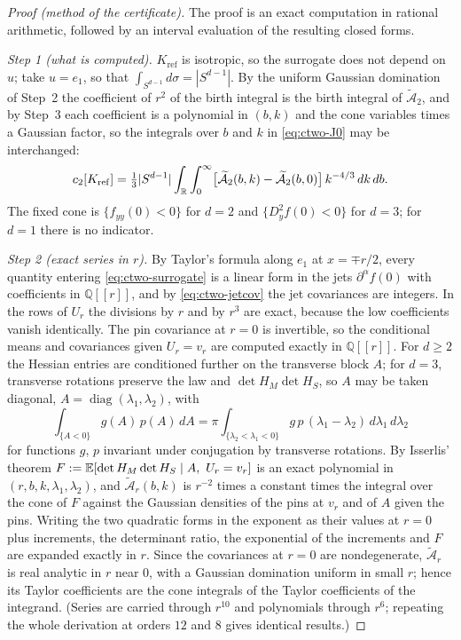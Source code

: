 \begin{proof}[Proof (method of the certificate)]
The proof is an exact computation in rational arithmetic, followed by an interval evaluation of the resulting closed forms.

\emph{Step 1 (what is computed).} $K_{\mathrm{ref}}$ is isotropic, so the surrogate does not depend on $u$; take $u=e_1$, so that $\int_{S^{d-1}}d\sigma=|S^{d-1}|$. By the uniform Gaussian domination of Step~2 the coefficient of $r^2$ of the birth integral is the birth integral of $\widetilde{\mathcal A}_2$, and by Step~3 each coefficient is a polynomial in $(b,k)$ and the cone variables times a Gaussian factor, so the integrals over $b$ and $k$ in \eqref{eq:ctwo-J0} may be interchanged:
\[
c_2[K_{\mathrm{ref}}]=\tfrac13|S^{d-1}|\int_\mathbb R\int_0^\infty\bigl[\widetilde{\mathcal A}_2(b,k)-\widetilde{\mathcal A}_2(b,0)\bigr]\,k^{-4/3}\,dk\,db .
\]
The fixed cone is $\{f_{yy}(0)<0\}$ for $d=2$ and $\{D_y^2f(0)<0\}$ for $d=3$; for $d=1$ there is no indicator.

\emph{Step 2 (exact series in $r$).} By Taylor's formula along $e_1$ at $x=\mp r/2$, every quantity entering \eqref{eq:ctwo-surrogate} is a linear form in the jets $\partial^\alpha f(0)$ with coefficients in $\mathbb Q[[r]]$, and by \eqref{eq:ctwo-jetcov} the jet covariances are integers. In the rows of $U_r$ the divisions by $r$ and by $r^3$ are exact, because the low coefficients vanish identically. The pin covariance at $r=0$ is invertible, so the conditional means and covariances given $U_r=v_r$ are computed exactly in $\mathbb Q[[r]]$. For $d\ge2$ the Hessian entries are conditioned further on the transverse block $A$; for $d=3$, transverse rotations preserve the law and $\det H_M\det H_S$, so $A$ may be taken diagonal, $A=\operatorname{diag}(\lambda_1,\lambda_2)$, with
\[
\int_{\{A<0\}}g(A)\,p(A)\,dA=\pi\int_{\{\lambda_2<\lambda_1<0\}}g\,p\,(\lambda_1-\lambda_2)\,d\lambda_1\,d\lambda_2
\]
for functions $g$, $p$ invariant under conjugation by transverse rotations. By Isserlis' theorem $F:=\E[\det H_M\det H_S\mid A,\ U_r=v_r]$ is an exact polynomial in $(r,b,k,\lambda_1,\lambda_2)$, and $\widetilde{\mathcal A}_r(b,k)$ is $r^{-2}$ times a constant times the integral over the cone of $F$ against the Gaussian densities of the pins at $v_r$ and of $A$ given the pins. Writing the two quadratic forms in the exponent as their values at $r=0$ plus increments, the determinant ratio, the exponential of the increments and $F$ are expanded exactly in $r$. Since the covariances at $r=0$ are nondegenerate, $\widetilde{\mathcal A}_r$ is real analytic in $r$ near $0$, with a Gaussian domination uniform in small $r$; hence its Taylor coefficients are the cone integrals of the Taylor coefficients of the integrand. (Series are carried through $r^{10}$ and polynomials through $r^6$; repeating the whole derivation at orders $12$ and $8$ gives identical results.)


\end{proof}
